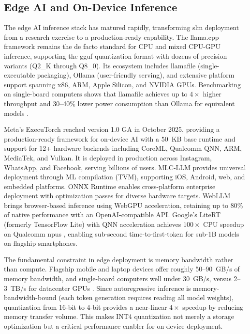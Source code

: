 \subsection{Edge AI and On-Device Inference}
\label{subsec:background_edge_ai}
The edge AI inference stack has matured rapidly, transforming \gls{slm} deployment from a research exercise to a production-ready capability. The llama.cpp framework \citep{gerganov2023llamacpp} remains the de facto standard for CPU and mixed CPU-GPU inference, supporting the \gls{gguf} quantization format with dozens of precision variants (Q2\_K through Q8\_0). Its ecosystem includes llamafile (single-executable packaging), Ollama (user-friendly serving), and extensive platform support spanning x86, ARM, Apple Silicon, and NVIDIA GPUs. Benchmarking on single-board computers shows that llamafile achieves up to $4\times$ higher throughput and 30--40\% lower power consumption than Ollama for equivalent models \citep{costa2025sbc}.

Meta's ExecuTorch \citep{meta2024executorch} reached version 1.0 GA in October 2025, providing a production-ready framework for on-device AI with a 50~KB base runtime and support for 12+ hardware backends including CoreML, Qualcomm QNN, ARM, MediaTek, and Vulkan. It is deployed in production across Instagram, WhatsApp, and Facebook, serving billions of users. MLC-LLM \citep{mlc2024} provides universal deployment through ML compilation (TVM), supporting iOS, Android, web, and embedded platforms. ONNX Runtime \citep{microsoft2019onnx} enables cross-platform enterprise deployment with optimization passes for diverse hardware targets. WebLLM \citep{webllm2024} brings browser-based inference using WebGPU acceleration, retaining up to 80\% of native performance with an OpenAI-compatible API. Google's LiteRT (formerly TensorFlow Lite) with QNN acceleration achieves $100\times$ CPU speedup on Qualcomm \glspl{npu} \citep{google2025litert}, enabling sub-second time-to-first-token for sub-1B models on flagship smartphones.

The fundamental constraint in edge deployment is memory bandwidth rather than compute. Flagship mobile and laptop devices offer roughly 50--90~GB/s of memory bandwidth, and single-board computers well under 30~GB/s, versus 2--3~TB/s for datacenter GPUs \citep{xu2024device}. Since autoregressive inference is memory-bandwidth-bound (each token generation requires reading all model weights), quantization from 16-bit to 4-bit provides a near-linear $4\times$ speedup by reducing memory transfer volume. This makes INT4 quantization not merely a storage optimization but a critical performance enabler for on-device deployment.


